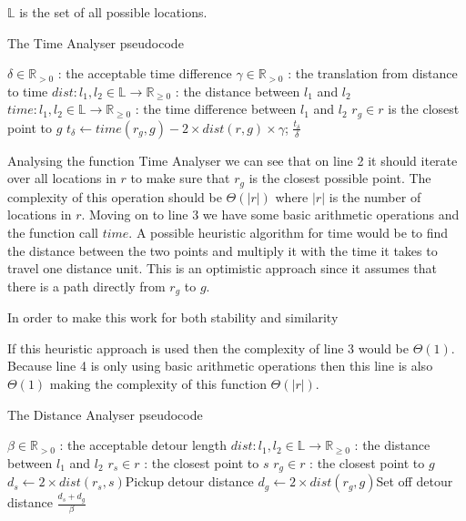 $\mathbb{L}$ is the set of all possible locations.

\begin{algorithm}
	\caption{The Time Analyser pseudocode}
	\begin{algorithmic}[1]
		\Require 
		\Statex $\delta\in \mathbb{R}_{>0}$ : the acceptable time difference
		\Statex $\gamma\in\mathbb{R}_{>0}$ : the translation from distance to time
		\Statex $dist : l_1,l_2 \in \mathbb{L} \rightarrow \mathbb{R}_{\geq 0}$ : the distance between $l_1$ and $l_2$
		\Statex $time : l_1,l_2 \in \mathbb{L} \rightarrow \mathbb{R}_{\geq 0}$ : the time difference between $l_1$ and $l_2$
		\Statex 
			\State $r_g \in r$ is the closest point to $g$
			\State $t_\delta\gets time(r_g, g) - 2\times dist(r,g)\times\gamma$;
			\State\Return $\frac{t_\delta}{\delta}$
		\EndFunction
	\end{algorithmic}
\end{algorithm}

Analysing the function Time Analyser we can see that on line 2 it should iterate over all locations in $r$ to make sure that $r_g$ is the closest possible point.
The complexity of this operation should be $\Theta(|r|)$ where $|r|$ is the number of locations in $r$.
Moving on to line 3 we have some basic arithmetic operations and the function call $time$.
A possible heuristic algorithm for time would be to find the distance between the two points and multiply it with the time it takes to travel one distance unit. 
This is an optimistic approach since it assumes that there is a path directly from $r_g$ to $g$.

In order to make this work for both stability and similarity

If this heuristic approach is used then the complexity of line 3 would be $\Theta(1)$.
Because line 4 is only using basic arithmetic operations then this line is also $\Theta(1)$ making the complexity of this function $\Theta(|r|)$.

 \begin{algorithm}
	\caption{The Distance Analyser pseudocode}
	\begin{algorithmic}[1]
		\Require 
		\Statex $\beta \in \mathbb{R}_{>0}$ : the acceptable detour length
		\Statex $dist : l_1,l_2 \in \mathbb{L} \rightarrow \mathbb{R}_{\geq 0}$ : the distance between $l_1$ and $l_2$
		\Statex 
			\State $r_s \in r$ : the closest point to $s$
			\State $r_g \in r$ : the closest point to $g$
			\State $d_s\gets 2\times dist(r_s, s)$\Comment Pickup detour distance
			\State $d_g\gets 2\times dist(r_g, g)$\Comment Set off detour distance
			\State\Return $\frac{d_s + d_g}{\beta}$
		\EndFunction
	\end{algorithmic}
\end{algorithm}

